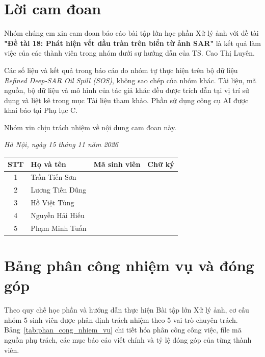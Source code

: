 \clearpage
{}
{}
\chapter*{Lời cam đoan}

Nhóm chúng em xin cam đoan báo cáo bài tập lớn học phần Xử lý ảnh với đề tài \textbf{"Đề tài 18: Phát hiện vết dầu tràn trên biển từ ảnh SAR"} là kết quả làm việc của các thành viên trong nhóm dưới sự hướng dẫn của TS. Cao Thị Luyên.

Các số liệu và kết quả trong báo cáo do nhóm tự thực hiện trên bộ dữ liệu \textit{Refined Deep-SAR Oil Spill (SOS)}, không sao chép của nhóm khác. Tài liệu, mã nguồn, bộ dữ liệu và mô hình của tác giả khác đều được trích dẫn tại vị trí sử dụng và liệt kê trong mục Tài liệu tham khảo. Phần sử dụng công cụ AI được khai báo tại Phụ lục C.

Nhóm xin chịu trách nhiệm về nội dung cam đoan này.

\vspace{0.4cm}
\begin{flushright}
    \textit{Hà Nội, ngày 15 tháng 11 năm 2026}
\end{flushright}
\vspace{0.2cm}

\begin{center}
\begin{tabular}{|c|p{5.5cm}|p{3.5cm}|p{3.2cm}|}
\hline
\textbf{STT} & \textbf{Họ và tên} & \textbf{Mã sinh viên} & \textbf{Chữ ký} \\ \hline
1 & Trần Tiến Sơn & & \\[0.8cm] \hline
2 & Lương Tiến Dũng & & \\[0.8cm] \hline
3 & Hồ Việt Tùng & & \\[0.8cm] \hline
4 & Nguyễn Hải Hiếu & & \\[0.8cm] \hline
5 & Phạm Minh Tuấn & & \\[0.8cm] \hline
\end{tabular}
\end{center}

\clearpage
{}
{}
\chapter*{Bảng phân công nhiệm vụ và đóng góp}

Theo quy chế học phần và hướng dẫn thực hiện Bài tập lớn Xử lý ảnh, cơ cấu nhóm 5 sinh viên được phân định trách nhiệm theo 5 vai trò chuyên trách. Bảng~\ref{tab:phan_cong_nhiem_vu} chi tiết hóa phân công công việc, file mã nguồn phụ trách, các mục báo cáo viết chính và tỷ lệ đóng góp của từng thành viên.

